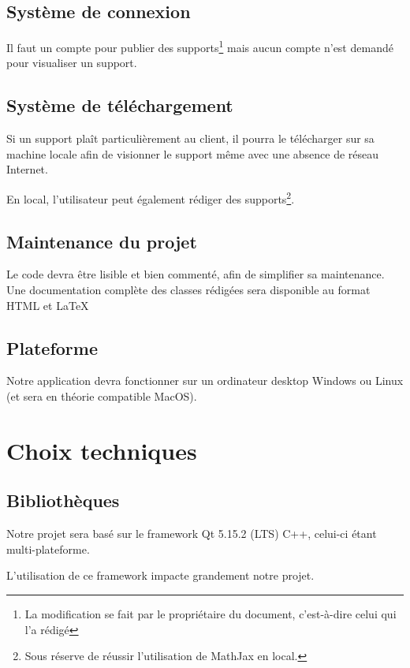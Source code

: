{\section{Système de connexion}

Il faut un compte pour publier des supports\footnote{La modification se fait par le propriétaire du document, c'est-à-dire celui qui l'a rédigé} mais aucun compte n'est demandé pour visualiser un support.

\section{Système de téléchargement}

Si un support plaît particulièrement au client, il pourra le télécharger sur sa machine locale afin de visionner le support même avec une absence de réseau Internet.

En local, l'utilisateur peut également rédiger des supports\footnote{Sous réserve de réussir l'utilisation de MathJax en local.}.

\section{Maintenance du projet}

Le code devra être lisible et bien commenté, afin de simplifier sa maintenance.
Une documentation complète des classes rédigées sera disponible au format HTML et \LaTeX


\section{Plateforme}

Notre application devra fonctionner sur un ordinateur desktop Windows ou Linux (et sera en théorie compatible MacOS).


\chapter{Choix techniques}

\section{Bibliothèques}

Notre projet sera basé sur le framework Qt 5.15.2 (LTS) C++, celui-ci étant multi-plateforme.

L'utilisation de ce framework impacte grandement notre projet.

}
